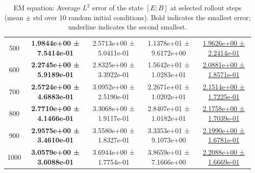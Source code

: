 \documentclass{article}
\theoremstyle{plain}
\theoremstyle{definition}
\theoremstyle{remark}
\begin{document}
\begin{table}[htbp]
\begin{tabular}{ccccc}
500 & \textbf{1.9844e+00 ± 7.5414e-01} & 2.5713e+00 ± 5.0411e-01 & 1.1378e+01 ± 9.6172e+00 & \underline{1.9626e+00 ± 2.2414e-01} \\
600 & \textbf{2.2745e+00 ± 5.9189e-01} & 2.8325e+00 ± 3.3922e-01 & 1.5642e+01 ± 1.0283e+01 & \underline{2.0881e+00 ± 1.8571e-01} \\
700 & \textbf{2.5724e+00 ± 4.6883e-01} & 3.0952e+00 ± 2.5190e-01 & 2.2671e+01 ± 1.0202e+01 & \underline{2.1514e+00 ± 1.7225e-01} \\
800 & \textbf{2.7710e+00 ± 4.1466e-01} & 3.3068e+00 ± 1.9117e-01 & 2.8407e+01 ± 1.0182e+01 & \underline{2.1758e+00 ± 1.7039e-01} \\
900 & \textbf{2.9575e+00 ± 3.4610e-01} & 3.5580e+00 ± 1.8327e-01 & 3.3353e+01 ± 9.1073e+00 & \underline{2.1990e+00 ± 1.6781e-01} \\
1000& \textbf{3.0579e+00 ± 3.6088e-01} & 3.6944e+00 ± 1.7754e-01 & 3.8659e+01 ± 7.1666e+00 & \underline{2.2088e+00 ± 1.6669e-01} \\
\hline
\end{tabular}
\caption{EM equation: Average $L^2$ error of the state $[E;B]$ at selected rollout steps
(mean $\pm$ std over 10 random initial conditions).
Bold indicates the smallest error; underline indicates the second smallest.}
\label{tab:em-l2_errors_time_rows}
\end{table}
\end{document}
